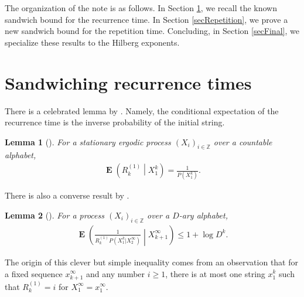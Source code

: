 \documentclass[a4paper]{article}
\newcommand{\okra}[1]{\left( #1 \right)}
\DeclareMathOperator{\mean}{\mathbf{E}}
\newtheorem{lemma}{Lemma}
\begin{document}
The organization of the note is as follows. In Section
\ref{secRecurrence}, we recall the known sandwich bound for the
recurrence time. In Section \ref{secRepetition}, we prove a new
sandwich bound for the repetition time. Concluding, in Section
\ref{secFinal}, we specialize these results to the Hilberg exponents.




\section{Sandwiching recurrence times}
\label{secRecurrence}

There is a celebrated lemma by \citeauthor{Kac47}. Namely, the
conditional expectation of the recurrence time is the inverse
probability of the initial string.
\begin{lemma}[\citep{Kac47}]
  \label{theoKac}
  For a stationary ergodic process $(X_i)_{i\in\mathbb{Z}}$ over a
  countable alphabet,
  \begin{align}
    \mean\okra{R^{(1)}_k\middle|X_1^k}
    =
    \frac{1}{P(X_1^k)}.
  \end{align}
\end{lemma}
There is also a converse result by \citeauthor{Kontoyiannis98}.
\begin{lemma}[\citep{Kontoyiannis98}]
  \label{theoKontoyiannis}
  For a process $(X_i)_{i\in\mathbb{Z}}$ over a $D$-ary alphabet,
  \begin{align}
    \mean\okra{\frac{1}{R^{(1)}_k
    P(X_1^k|X_2^\infty)}\middle|X_{k+1}^\infty}
    \le
    1+\log D^k.
  \end{align}
\end{lemma}
The origin of this clever but simple inequality comes from an
observation that for a fixed sequence $x_{k+1}^\infty$ and any number
$i\ge 1$, there is at most one string $x_1^k$ such that $R^{(1)}_k=i$
for $X_1^\infty=x_1^\infty$.
\end{document}
